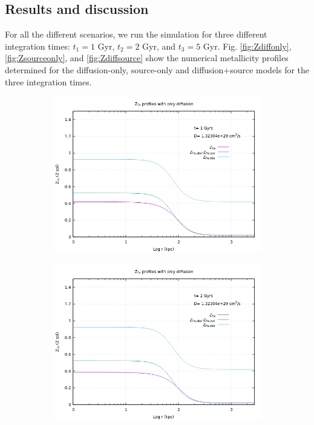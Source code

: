 \documentclass{article}
\begin{document}
\subsection{Results and discussion}
For all the different scenarios, we run the simulation for three different integration times: $t_{1}=1 $ Gyr, $t_{2}=2$ Gyr, and $t_{3}=5$ Gyr. Fig. \ref{fig:Zdiffonly}, \ref{fig:Zsourceonly}, and \ref{fig:Zdiffsource} show the numerical metallicity profiles determined for the diffusion-only, source-only and diffusion+source models for the three integration times.
\begin{figure} [H]
	\centering
	\begin{subfigure}{0.49\textwidth}
		\includegraphics[width=0.9\linewidth]{Z_diff_1.png}
	\end{subfigure}
	\begin{subfigure}{0.49\textwidth}
		\includegraphics[width=0.9\linewidth]{Z_diff_2.png}

\end{subfigure}
\end{figure}
\end{document}
